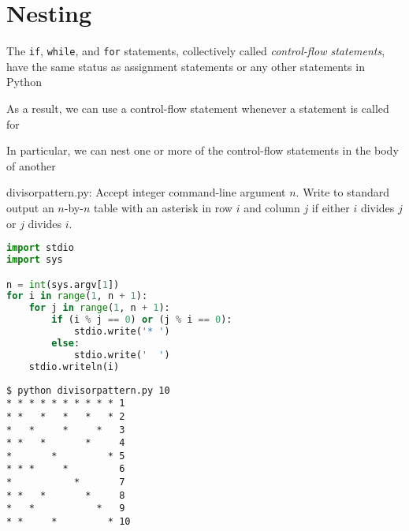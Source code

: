 \documentclass[8pt,a4paper,compress]{beamer}
\begin{document}
\section{Nesting}
\begin{frame}[fragile]
The \lstinline{if}, \lstinline{while}, and \lstinline{for} statements, collectively called \emph{control-flow statements}, have the same status as assignment statements or any other statements in Python

\bigskip

As a result, we can use a control-flow statement whenever a statement is called for

\bigskip

In particular, we can nest one or more of the control-flow statements in the body of another
\end{frame}

\begin{frame}[fragile]
\begin{framed}
\tiny divisorpattern.py: Accept integer command-line argument $n$. Write to standard output an $n$-by-$n$ table with an asterisk in row $i$ and column $j$ if either $i$ divides $j$ or $j$ divides $i$.
\end{framed}

\begin{lstlisting}[language=Python]
import stdio
import sys

n = int(sys.argv[1])
for i in range(1, n + 1):
    for j in range(1, n + 1):
        if (i % j == 0) or (j % i == 0):
            stdio.write('* ')
        else:
            stdio.write('  ')
    stdio.writeln(i)
\end{lstlisting}

\begin{lstlisting}[language={}]
$ python divisorpattern.py 10
* * * * * * * * * * 1
* *   *   *   *   * 2
*   *     *     *   3
* *   *       *     4
*       *         * 5
* * *     *         6
*           *       7
* *   *       *     8
*   *           *   9
* *     *         * 10
\end{lstlisting}
\end{frame}
\end{document}
